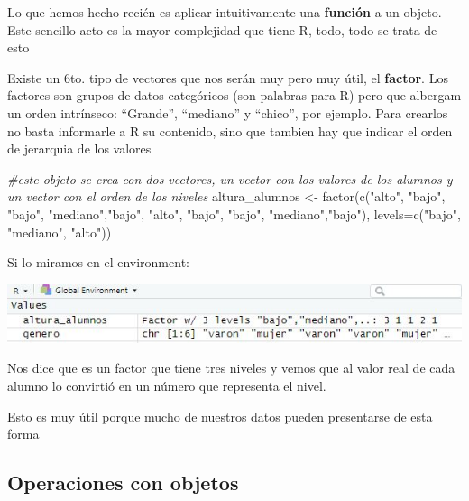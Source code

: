 \documentclass[
]{book}
\newenvironment{Shaded}{\begin{snugshade}}{\end{snugshade}}
\newcommand{\AttributeTok}[1]{\textcolor[rgb]{0.77,0.63,0.00}{#1}}
\newcommand{\CommentTok}[1]{\textcolor[rgb]{0.56,0.35,0.01}{\textit{#1}}}
\newcommand{\FunctionTok}[1]{\textcolor[rgb]{0.00,0.00,0.00}{#1}}
\newcommand{\NormalTok}[1]{#1}
\newcommand{\OtherTok}[1]{\textcolor[rgb]{0.56,0.35,0.01}{#1}}
\newcommand{\StringTok}[1]{\textcolor[rgb]{0.31,0.60,0.02}{#1}}
\begin{document}
Lo que hemos hecho recién es aplicar intuitivamente una \textbf{función} a un objeto. Este sencillo acto es la mayor complejidad que tiene R, todo, todo se trata de esto

Existe un 6to. tipo de vectores que nos serán muy pero muy útil, el \textbf{factor}. Los factores son grupos de datos categóricos (son palabras para R) pero que albergam un orden intrínseco: ``Grande'', ``mediano'' y ``chico'', por ejemplo. Para crearlos no basta informarle a R su contenido, sino que tambien hay que indicar el orden de jerarquia de los valores

\begin{Shaded}
\begin{Highlighting}[]
\CommentTok{\#este objeto se crea con dos vectores, un vector con los valores de los alumnos y un vector con el orden de los niveles}
\NormalTok{altura\_alumnos }\OtherTok{\textless{}{-}} \FunctionTok{factor}\NormalTok{(}\FunctionTok{c}\NormalTok{(}\StringTok{"alto"}\NormalTok{, }\StringTok{"bajo"}\NormalTok{, }\StringTok{"bajo"}\NormalTok{, }\StringTok{"mediano"}\NormalTok{,}\StringTok{"bajo"}\NormalTok{, }\StringTok{"alto"}\NormalTok{, }\StringTok{"bajo"}\NormalTok{, }\StringTok{"bajo"}\NormalTok{, }\StringTok{"mediano"}\NormalTok{,}\StringTok{"bajo"}\NormalTok{),}
                       \AttributeTok{levels=}\FunctionTok{c}\NormalTok{(}\StringTok{"bajo"}\NormalTok{, }\StringTok{"mediano"}\NormalTok{, }\StringTok{"alto"}\NormalTok{))}
\end{Highlighting}
\end{Shaded}

Si lo miramos en el environment:

\includegraphics[width=8.39in]{img/Rstudiofig5}

Nos dice que es un factor que tiene tres niveles y vemos que al valor real de cada alumno lo convirtió en un número que representa el nivel.

Esto es muy útil porque mucho de nuestros datos pueden presentarse de esta forma

\hypertarget{operaciones-con-objetos}{%
\subsection{Operaciones con objetos}\label{operaciones-con-objetos}}
\end{document}
